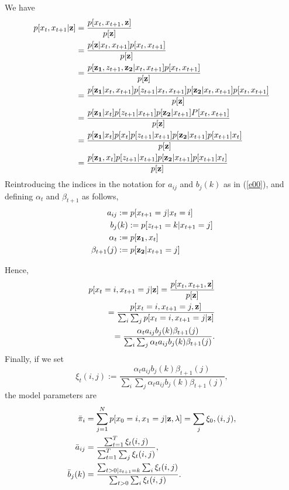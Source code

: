 \documentclass{article}
\begin{document}
We have 
\begin{equation}
\begin{split}
p[x_t, x_{t+1}|{\bf{z}}] &= \frac{p[x_t,x_{t+1},{\bf{z}}]}{p[\bf{z}]} \\
&= \frac{p[{\bf{z}}|x_t, x_{t+1}]p[x_t, x_{t+1}]}{p[\bf{z}]} \\
&= \frac{p[{\bf{z}_1},z_{t+1},{\bf{z}_2}|x_t, x_{t+1}]p[x_t, x_{t+1}]}{p[\bf{z}]} \\
&= \frac{p[{\bf{z}_1}|x_t, x_{t+1}]p[z_{t+1}|x_t, x_{t+1}]p[{\bf{z}_2}|x_t, x_{t+1}]p[x_t, x_{t+1}]}{p[\bf{z}]} \\
&= \frac{p[{\bf{z}_1}|x_t]p[z_{t+1}|x_{t+1}]p[{\bf{z}_2}| x_{t+1}]P[x_t, x_{t+1}]}{p[\bf{z}]}\\
&= \frac{p[{\bf{z}_1}|x_t]p[x_t]p[z_{t+1}|x_{t+1}]p[{\bf{z}_2}| x_{t+1}]p[x_{t+1}|x_t]}{p[\bf{z}]} \\
&= \frac{p[{\bf{z}_1},x_t]p[z_{t+1}|x_{t+1}]p[{\bf{z}_2}| x_{t+1}]p[x_{t+1}|x_t]}{p[\bf{z}]}
\end{split}
\end{equation}
Reintroducing the indices in the notation for $a_{ij}$ and $b_j(k)$ as in (\ref{e00}), and defining $\alpha_t$ and $\beta_{t+1}$ as follows,
\begin{align}
a_{ij} &:= p[x_{t+1}=j|x_{t}=i] \\
b_{j}&(k):= p[z_{t+1}=k|x_{t+1}=j]\\
\alpha_t &:= p[{\bf{z}_1},x_t] \\
\beta_{t+1}(j)&:=p[{\bf{z}_2}| x_{t+1}=j] 
\end{align}

Hence,
\begin{equation}
\begin{split}
p[x_t = i, x_{t+1} = j |{\bf{z}}] 
= \frac{p[x_t,x_{t+1},{\bf{z}}]}{p[\bf{z}]} \\
= \frac{p[x_t = i,x_{t+1} = j,{\bf{z}}]}{\sum_i \sum_j p[x_t = i, x_{t+1} = j |{\bf{z}}]} \\
= \frac{\alpha_{t} a_{ij} b_j(k)\beta_{t+1}(j)  }{\sum_i \sum_j \alpha_{t} a_{ij} b_j(k)\beta_{t+1}(j) }.
\end{split}
\end{equation}
Finally, if we set 
\begin{equation}
\xi_t(i,j):= \frac{\alpha_{t} a_{ij} b_j(k)\beta_{t+1}(j)  }{\sum_i \sum_j \alpha_{t} a_{ij} b_j(k)\beta_{t+1}(j) },    
\end{equation} the model parameters are
\begin{align}
\bar \pi_i &=  \sum_{j=1}^N \label{} p[x_0=i,x_1=j|{\bf{z}}, \lambda] = \sum_j \xi_0, (i,j),
 \nonumber \\
\bar a_{ij} &= \frac{\sum_{t=1}^T \xi_t(i,j)}  {\sum_{t=1}^T \sum_{j} \xi_t(i,j)},
\nonumber \\
 \bar b_j(k) & = \frac{\sum_{t>0| z_{t+1} = k} \sum_i \xi_t(i,j)}{\sum_{t>0} \sum_i \xi_t(i,j)}. \label{}
\end{align}
\end{document}
